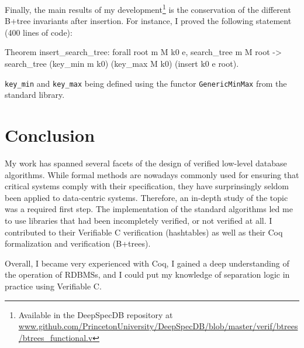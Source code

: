 \documentclass[11pt]{article}
\def\coqe{\lstinline[language=Coq, basicstyle=\small]}
\begin{document}
Finally, the main results of my development\footnote{Available in the DeepSpecDB repository at \url{www.github.com/PrincetonUniversity/DeepSpecDB/blob/master/verif/btrees/btrees_functional.v}} is the conservation of the different B+tree invariants after insertion.
For instance, I proved the following statement (400 lines of code):
\begin{coq}
Theorem insert_search_tree: forall root m M k0 e,
    search_tree m M root -> search_tree (key_min m k0) (key_max M k0) (insert k0 e root).
\end{coq}
\coqe{key_min} and \coqe{key_max} being defined using the functor \coqe{GenericMinMax} from the standard library.

\section{Conclusion}

My work has spanned several facets of the design of verified low-level database algorithms.
While formal methods are nowadays commonly used for ensuring that critical systems comply with their specification,
they have surprinsingly seldom been applied to data-centric systems.
Therefore, an in-depth study of the topic was a required first step.
The implementation of the standard algorithms led me to use libraries
that had been incompletely verified, or not verified at all.
I contributed to their Verifiable C verification (hashtables) as well as their Coq formalization and verification (B+trees).

Overall, I became very experienced with Coq, I gained a deep understanding of the operation of RDBMSs, and
I could put my knowledge of separation logic in practice using Verifiable C.

\newpage


\end{document}
